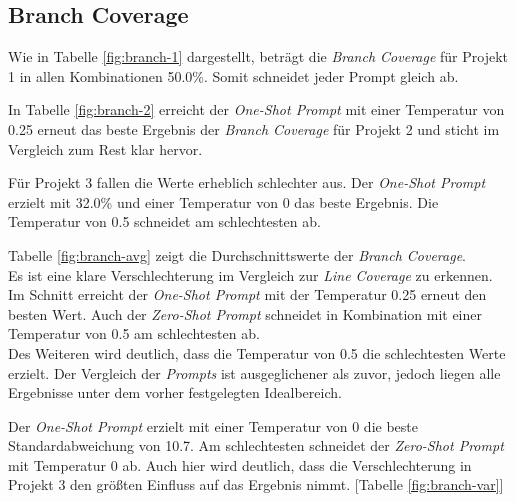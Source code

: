 \subsection{Branch Coverage}
Wie in Tabelle \ref{fig:branch-1} dargestellt, beträgt die \textit{Branch Coverage} für Projekt 1 in allen Kombinationen 50.0\%. Somit schneidet jeder Prompt gleich ab.

In Tabelle \ref{fig:branch-2} erreicht der \textit{One-Shot Prompt} mit einer Temperatur von 0.25 erneut das beste Ergebnis der \textit{Branch Coverage} für Projekt 2 und sticht im Vergleich zum Rest klar hervor.

Für Projekt 3 fallen die Werte erheblich schlechter aus. Der \textit{One-Shot Prompt} erzielt mit 32.0\% und einer Temperatur von 0 das beste Ergebnis. Die Temperatur von 0.5 schneidet am schlechtesten ab.

Tabelle \ref{fig:branch-avg} zeigt die Durchschnittswerte der \textit{Branch Coverage}. \\Es ist eine klare Verschlechterung im Vergleich zur \textit{Line Coverage} zu erkennen. Im Schnitt erreicht der \textit{One-Shot Prompt} mit der Temperatur 0.25 erneut den besten Wert. Auch der \textit{Zero-Shot Prompt} schneidet in Kombination mit einer Temperatur von 0.5 am schlechtesten ab.\\ Des Weiteren wird deutlich, dass die Temperatur von 0.5 die schlechtesten Werte erzielt. Der Vergleich der \textit{Prompts} ist ausgeglichener als zuvor, jedoch liegen alle Ergebnisse unter dem vorher festgelegten Idealbereich. 

Der \textit{One-Shot Prompt} erzielt mit einer Temperatur von 0 die beste Standardabweichung von 10.7. Am schlechtesten schneidet der \textit{Zero-Shot Prompt} mit Temperatur 0 ab. Auch hier wird deutlich, dass die Verschlechterung in Projekt 3 den größten Einfluss auf das Ergebnis nimmt. [Tabelle \ref{fig:branch-var}]


